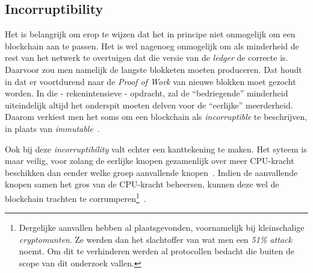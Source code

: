 \subsection{Incorruptibility}
\label{sub:incorruptibility}

Het is belangrijk om erop te wijzen dat het in principe niet onmogelijk om een blockchain aan te passen. Het is wel nagenoeg onmogelijk om als minderheid de rest van het netwerk te overtuigen dat die versie van de \textit{ledger} de correcte is. Daarvoor zou men namelijk de langste blokketen moeten produceren. Dat houdt in dat er voortdurend naar de \textit{Proof of Work} van nieuwe blokken moet gezocht worden. In die - rekenintensieve - opdracht, zal de ``bedriegende'' minderheid uiteindelijk altijd het onderspit moeten delven voor de ``eerlijke'' meerderheid. Daarom verkiest men het soms om een blockchain als \textit{incorruptible} te beschrijven, in plaats van \textit{immutable}~\autocite{Salem2008}.

Ook bij deze \textit{incorruptibility} valt echter een kanttekening te maken. Het syteem is maar veilig, voor zolang de eerlijke knopen gezamenlijk over meer CPU-kracht beschikken dan eender welke groep aanvallende knopen~\autocite{Nakamoto2008}. Indien de aanvallende knopen samen het gros van de CPU-kracht beheersen, kunnen deze wel de blockchain trachten te corrumperen\footnote{Dergelijke aanvallen hebben al plaatsgevonden, voornamelijk bij kleinschalige \textit{cryptomunten}. Ze werden dan het slachtoffer van wat men een \textit{51\% attack} noemt. Om dit te verhinderen werden al protocollen bedacht die buiten de scope van dit onderzoek vallen.}~\autocite{Anita2019}.


